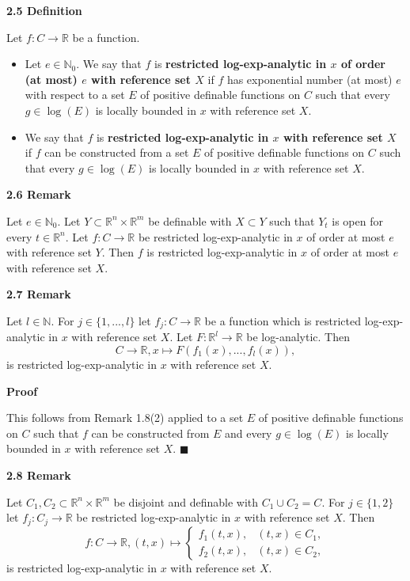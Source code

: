 \documentclass[12pt]{article}
\def\vs{\vspace}
\begin{document}
\vs{0.5cm}
{\bf2.5 Definition}

\vs{0.1cm}
Let $f:C \to \mathbb{R}$ be a function.
\begin{itemize}
	\item [(a)]
	Let $e \in \mathbb{N}_0$. We say that $f$ is \textbf{restricted log-exp-analytic in $x$ of order (at most) $e$ with reference set $X$} if $f$ has exponential number (at most) $e$ with respect to a set $E$ of positive definable functions on $C$ such that every $g \in \log(E)$ is locally bounded in $x$ with reference set $X$.
	
	\item [(b)]
	We say that $f$ is \textbf{restricted log-exp-analytic in $x$ with reference set $X$} if $f$ can be constructed from a set $E$ of positive definable functions on $C$ such that every $g \in \log(E)$ is locally bounded in $x$ with reference set $X$.
\end{itemize}

\vs{0.5cm}
{\bf2.6 Remark}

\vs{0.1cm}
Let $e \in \mathbb{N}_0$. Let $Y \subset \mathbb{R}^n \times \mathbb{R}^m$ be definable with $X \subset Y$ such that $Y_t$ is open for every $t \in \mathbb{R}^n$. Let $f:C \to \mathbb{R}$ be restricted log-exp-analytic in $x$ of order at most $e$ with reference set $Y$. Then $f$ is restricted log-exp-analytic in $x$ of order at most $e$ with reference set $X$.

\vs{0.5cm}
{\bf2.7 Remark}

\vs{0.1cm}
Let $l \in \mathbb{N}$. For $j \in \{1,...,l\}$ let $f_j:C \to \mathbb{R}$ be a function which is restricted log-exp-analytic in $x$ with reference set $X$. Let $F:\mathbb{R}^l \to \mathbb{R}$ be log-analytic. Then 
$$C \to \mathbb{R}, x \mapsto F(f_1(x),...,f_l(x)),$$
is restricted log-exp-analytic in $x$ with reference set $X$.

\vs{0.3cm}
{\bf Proof}

\vs{0.1cm}
This follows from Remark 1.8(2) applied to a set $E$ of positive definable functions on $C$ such that $f$ can be constructed from $E$ and every $g \in \log(E)$ is locally bounded in $x$ with reference set $X$. \hfill$\blacksquare$

\vs{0.5cm}
{\bf2.8 Remark}

\vs{0.1cm}
Let $C_1,C_2 \subset \mathbb{R}^n \times \mathbb{R}^m$ be disjoint and definable with $C_1 \cup C_2 = C$. For $j \in \{1,2\}$ let $f_j:C_j \to \mathbb{R}$ be restricted log-exp-analytic in $x$ with reference set $X$. Then
$$f:C \to \mathbb{R}, (t,x) \mapsto \left\{\begin{array}{ll} f_1(t,x) , & (t,x) \in C_1,  \\
f_2(t,x), & (t,x) \in C_2, \end{array}\right.$$
is restricted log-exp-analytic in $x$ with reference set $X$.
\end{document}
